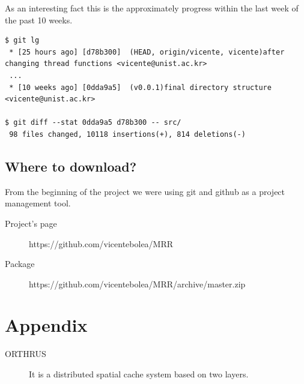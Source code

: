 \documentclass[nocopyrightspace]{sigplanconf}
\begin{document}
As an interesting fact this is the approximately progress within the last week of the 
past 10 weeks.

\begin{lstlisting}[]
$ git lg 
 * [25 hours ago] [d78b300]  (HEAD, origin/vicente, vicente)after changing thread functions <vicente@unist.ac.kr>
 ...
 * [10 weeks ago] [0dda9a5]  (v0.0.1)final directory structure <vicente@unist.ac.kr>

$ git diff --stat 0dda9a5 d78b300 -- src/
 98 files changed, 10118 insertions(+), 814 deletions(-)
\end{lstlisting}

\subsection*{Where to download?}
From the beginning of the project we were using git and github as a project management tool.

\begin{description}
\item[Project's page] https://github.com/vicentebolea/MRR
\item[Package] https://github.com/vicentebolea/MRR/archive/master.zip
\end{description}


\appendix
\section*{Appendix}
\begin{description}
\item[ORTHRUS] It is a distributed spatial cache system based on two layers.
\end{description}





%


\nocite{*} 
{}


\end{document}
